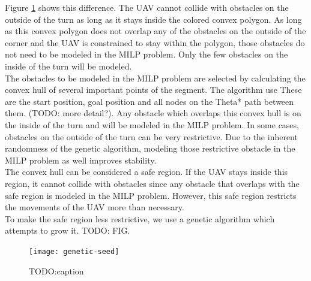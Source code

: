 Figure \ref{fig:genetic-convex} shows this difference. The UAV cannot collide with obstacles on the outside of the turn as long as it stays inside the colored convex polygon. As long as this convex polygon does not overlap any of the obstacles on the outside of the corner and the UAV is constrained to stay within the polygon, those obstacles do not need to be modeled in the MILP problem. Only the few obstacles on the inside of the turn will be modeled.\\


The obstacles to be modeled in the MILP problem are selected by calculating the convex hull of several important points of the segment. The algorithm use These are the start position, goal position and all nodes on the Theta* path between them. (TODO: more detail?). Any obstacle which overlaps this convex hull is on the inside of the turn and will be modeled in the MILP problem. In some cases, obstacles on the outside of the turn can be very restrictive. Due to the inherent randomness of the genetic algorithm, modeling those restrictive obstacle in the MILP problem as well improves stability. \\
The convex hull can be considered a safe region. If the UAV stays inside this region, it cannot collide with obstacles since any obstacle that overlaps with the safe region is modeled in the MILP problem. However, this safe region restricts the movements of the UAV more than necessary. \\
To make the safe region less restrictive, we use a genetic algorithm which attempts to grow it. TODO: FIG.
\begin{figure}
\centering
\texttt{[image: genetic-seed]}
\caption[TODO:caption]{TODO:caption}
\label{fig:genetic-convex}
\end{figure}
